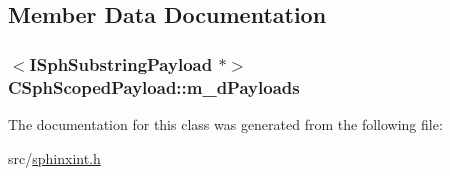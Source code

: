 \subsection{Member Data Documentation}
\hypertarget{classCSphScopedPayload_a8a85e81ce7a963bbab7590e6e17f6602}{
\subsubsection[{m\-\_\-d\-Payloads}]{$<${\bf I\-Sph\-Substring\-Payload} $\ast$$>$ C\-Sph\-Scoped\-Payload\-::m\-\_\-d\-Payloads\hspace{0.3cm}{\ttfamily [private]}}}\label{classCSphScopedPayload_a8a85e81ce7a963bbab7590e6e17f6602}


The documentation for this class was generated from the following file\-:\begin{DoxyCompactItemize}
\item 
src/\hyperlink{sphinxint_8h}{sphinxint.\-h}\end{DoxyCompactItemize}
